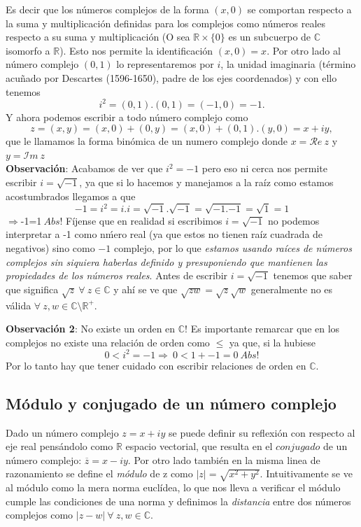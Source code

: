 \documentclass[a4paper,spanish]{article}
\def\Rea {\mathcal{R}e}
\def\Ima {\mathcal{I}m}
\def\C {\mathbb{C}}
\def\R {\mathbb{R}}
\numberwithin{equation}{section}
\begin{document}
Es decir que los n\'umeros complejos de la forma $(x,0)$ se
comportan respecto a la suma y multiplicaci\'on definidas para los
complejos como n\'umeros reales respecto a su suma y
multiplicaci\'on (O sea $\R\times{\lbrace0\rbrace}$ es un
subcuerpo de $\C$ isomorfo a $\R$). Esto nos permite la
identificaci\'on $\textbf{$(x,0)=x$}$. Por otro lado al n\'umero
complejo $(0,1)$ lo representaremos por $\textit{i}$, la unidad
imaginaria (t\'ermino acu\~nado por Descartes (1596-1650), padre de
los ejes coordenados) y con ello
tenemos\[i^2=(0,1).(0,1)=(-1,0)=-1.\]
Y ahora podemos escribir a todo n\'umero complejo como \\
 \[z=(x,y)=(x,0)+(0,y)=(x,0)+(0,1).(y,0)=x+iy,\]
que le llamamos la forma bin\'omica de un numero complejo donde
$x=\Rea \ z $ y $y=\Ima \ z $
\\
\textbf{Observaci\'on}: Acabamos de ver que $i^2=-1$ pero eso ni
cerca nos permite escribir $i=\sqrt{-1}$, ya que si lo hacemos y
manejamos a la ra\'iz como estamos acostumbrados llegamos a que\\
\[-1=i^2=i.i=\sqrt{-1}.\sqrt{-1}=\sqrt{{-1}.{-1}}=\sqrt{1}=1\]
$\Longrightarrow $-1=1$ \ Abs! $ F\'ijense que en realidad si
escribimos  $i=\sqrt{-1}$ no podemos interpretar a -1 como n\'mero
real (ya que estos no tienen ra\'iz cuadrada de negativos) sino
como $-1$ complejo, por lo que \textit{estamos usando ra\'ices de
n\'umeros complejos sin siquiera haberlas definido y presuponiendo
que mantienen las propiedades de los n\'umeros reales}. Antes de
escribir $i=\sqrt{-1}$ tenemos que saber que significa
$\sqrt{z} \ \forall \ z\in\C$ y ah\'i se ve que
$\sqrt{zw}=\sqrt{z}\sqrt{w}$ generalmente no es v\'alida $\forall \ z,w \in\C\setminus\R^+$.

\textbf{Observaci\'on 2}: No existe un orden en $ \C$! Es
importante remarcar que en los complejos no existe una relaci\'on
de orden como $\leq$ ya que, si la hubiese
\[0<i^2=-1 \Longrightarrow \ 0<1 + {-1} = 0 \ Abs!\]
Por lo tanto hay que tener cuidado con escribir relaciones de
orden en $\C$.

\subsection{M\'odulo y conjugado de un n\'umero complejo}
Dado un n\'umero complejo $z=x+iy$ se puede definir su reflexi\'on
con respecto al eje real pens\'andolo como $\R$ espacio vectorial,
que resulta en el $\textit{conjugado}$ de un n\'umero complejo:
$\overline{z}=x-iy$. Por otro lado tambi\'en en la misma linea de
razonamiento se define el \textit{m\'odulo} de z como $\vert
z\vert=\sqrt{x^2+y^2}$. Intuitivamente se ve al m\'odulo como la
mera norma eucl\'idea, lo que nos lleva a verificar el m\'odulo
cumple las condiciones de una norma y definimos la
\textit{distancia} entre dos n\'umeros complejos como $\vert{z-w}\vert \ \forall \ z,w \in\C$.
\end{document}
